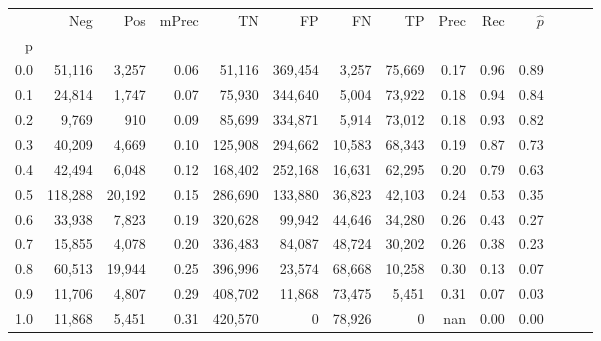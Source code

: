 \begin{tabular}{rrrrrrrrrrrrrr}
\toprule
{} &      Neg &     Pos & mPrec &       TN &       FP &      FN &      TP &  Prec &   Rec & $\hat{p}$ \\
p   &          &         &       &          &          &         &         &       &       &           \\
\midrule
0.0 &   51,116 &   3,257 &  0.06 &   51,116 &  369,454 &   3,257 &  75,669 &  0.17 &  0.96 &      0.89 \\
0.1 &   24,814 &   1,747 &  0.07 &   75,930 &  344,640 &   5,004 &  73,922 &  0.18 &  0.94 &      0.84 \\
0.2 &    9,769 &     910 &  0.09 &   85,699 &  334,871 &   5,914 &  73,012 &  0.18 &  0.93 &      0.82 \\
0.3 &   40,209 &   4,669 &  0.10 &  125,908 &  294,662 &  10,583 &  68,343 &  0.19 &  0.87 &      0.73 \\
0.4 &   42,494 &   6,048 &  0.12 &  168,402 &  252,168 &  16,631 &  62,295 &  0.20 &  0.79 &      0.63 \\
0.5 &  118,288 &  20,192 &  0.15 &  286,690 &  133,880 &  36,823 &  42,103 &  0.24 &  0.53 &      0.35 \\
0.6 &   33,938 &   7,823 &  0.19 &  320,628 &   99,942 &  44,646 &  34,280 &  0.26 &  0.43 &      0.27 \\
0.7 &   15,855 &   4,078 &  0.20 &  336,483 &   84,087 &  48,724 &  30,202 &  0.26 &  0.38 &      0.23 \\
0.8 &   60,513 &  19,944 &  0.25 &  396,996 &   23,574 &  68,668 &  10,258 &  0.30 &  0.13 &      0.07 \\
0.9 &   11,706 &   4,807 &  0.29 &  408,702 &   11,868 &  73,475 &   5,451 &  0.31 &  0.07 &      0.03 \\
1.0 &   11,868 &   5,451 &  0.31 &  420,570 &        0 &  78,926 &       0 &   nan &  0.00 &      0.00 \\
\bottomrule
\end{tabular}

